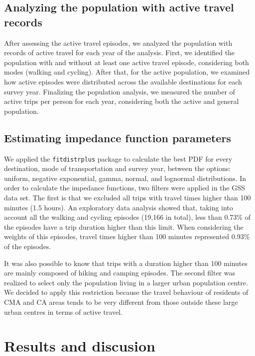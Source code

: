 \documentclass[preprint, 3p,
authoryear]{elsarticle} %
\begin{document}
\subsection{Analyzing the population with active travel
records}\label{analyzing-the-population-with-active-travel-records}

After assessing the active travel episodes, we analyzed the population
with records of active travel for each year of the analysis. First, we
identified the population with and without at least one active travel
episode, considering both modes (walking and cycling). After that, for
the active population, we examined how active episodes were distributed
across the available destinations for each survey year. Finalizing the
population analysis, we measured the number of active trips per person
for each year, considering both the active and general population.

\subsection{Estimating impedance function
parameters}\label{estimating-impedance-function-parameters}

We applied the \texttt{fitdistrplus} package
\citep{delignette2015fitdistrplus} to calculate the best PDF for every
destination, mode of transportation and survey year, between the
options: uniform, negative exponential, gamma, normal, and lognormal
distributions. In order to calculate the impedance functions, two
filters were applied in the GSS data set. The first is that we excluded
all trips with travel times higher than 100 minutes (1.5 hours). An
exploratory data analysis showed that, taking into account all the
walking and cycling episodes (19,166 in total), less than 0.73\% of the
episodes have a trip duration higher than this limit. When considering
the weights of this episodes, travel times higher than 100 minutes
represented 0.93\% of the episodes.

It was also possible to know that trips with a duration higher than 100
minutes are mainly composed of hiking and camping episodes. The second
filter was realized to select only the population living in a larger
urban population centre. We decided to apply this restriction because
the travel behaviour of residents of CMA and CA areas tends to be very
different from those outside these large urban centres in terms of
active travel.

\section{Results and discusion}\label{results-and-discusion}
\end{document}
